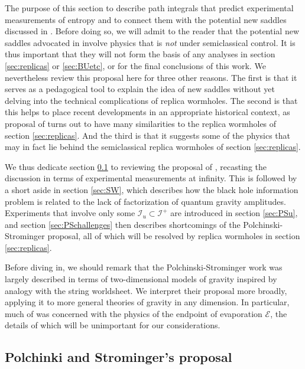 \documentclass[letterpaper,12pt]{article}
\newcommand*{\scri}{\mathscr{I}} %
\newcommand*{\evap}{\mathscr{E}} %
\begin{document}
The purpose of this section to describe path integrals that predict experimental measurements of entropy and to connect them with the potential new saddles discussed in \cite{Polchinski:1994zs}.  Before doing so, we will admit to the reader that the potential new saddles advocated in  \cite{Polchinski:1994zs} involve physics that is {\it not} under semiclassical control.  It is thus important that they will not form the basis of any analyses in section \ref{sec:replicas} or \ref{sec:BUetc}, or for the final conclusions of this work.   We nevertheless review this proposal here for three other reasons.  The first is that it serves as a pedagogical tool to explain the idea of new saddles without yet delving into the technical complications of replica wormholes.  The second is that this helps to place recent developments in an appropriate historical context, as proposal of \cite{Polchinski:1994zs} turns out to have many similarities to the replica wormholes of section \ref{sec:replicas}.  And the third is that it suggests some of the physics that may in fact lie behind the semiclassical replica wormholes of section \ref{sec:replicas}.


We thus dedicate section \ref{sec:PSP} to reviewing the proposal of \cite{Polchinski:1994zs},  recasting the discussion in terms of experimental measurements at infinity. This is followed by a short aside in section \ref{sec:SW}, which describes how the black hole information problem is related to the lack of factorization of quantum gravity amplitudes.   Experiments that involve only some $\scri_u\subset \scri^+$ are introduced in section \ref{sec:PSu}, and section \ref{sec:PSchallenges} then describes shortcomings of the Polchinski-Strominger proposal, all of which will be resolved by replica wormholes in section \ref{sec:replicas}.


Before diving in, we should remark that the Polchinski-Strominger work \cite{Polchinski:1994zs} was largely described in terms of two-dimensional models of gravity inspired by analogy with the string worldsheet. We interpret their proposal more broadly, applying it to more general theories of gravity in any dimension. In particular, much of \cite{Polchinski:1994zs} was concerned with the physics of the endpoint of evaporation $\evap$, the details of which will be unimportant for our considerations.



\subsection{Polchinki and Strominger's proposal}
\label{sec:PSP}
\end{document}
